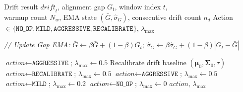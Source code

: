 \begin{algorithm}[t]
\caption{Agent Decision: Rule-Based KB Update Policy}
\label{alg:agent}
\begin{algorithmic}[1]
\REQUIRE Drift result $\textit{drift}_t$, alignment gap $G_t$, window index $t$, \\
\quad warmup count $N_w$, EMA state $(\bar{G}, \hat{\sigma}_G)$, consecutive drift count $n_d$
\ENSURE Action $\in \{\texttt{NO\_OP}, \texttt{MILD}, \texttt{AGGRESSIVE}, \texttt{RECALIBRATE}\}$, $\lambda_{\max}$

\STATE \textit{// Update Gap EMA:} $\bar{G} \leftarrow \beta \bar{G} + (1-\beta) G_t$; \; $\hat{\sigma}_G \leftarrow \beta \hat{\sigma}_G + (1-\beta)|G_t - \bar{G}|$

 
    \STATE $\textit{action} \leftarrow \texttt{AGGRESSIVE}$; \; $\lambda_{\max} \leftarrow 0.5$
        \STATE Recalibrate drift baseline $(\boldsymbol{\mu}_0, \boldsymbol{\Sigma}_0, \tau)$
    \ENDIF
{} 
    \STATE $\textit{action} \leftarrow \texttt{RECALIBRATE}$; \; $\lambda_{\max} \leftarrow 0.5$
 
    \STATE $\textit{action} \leftarrow \texttt{AGGRESSIVE}$; \; $\lambda_{\max} \leftarrow 0.5$
 
    \STATE $\textit{action} \leftarrow \texttt{MILD}$; \; $\lambda_{\max} \leftarrow 0.2$
\ELSE {}
    \STATE $\textit{action} \leftarrow \texttt{NO\_OP}$; \; $\lambda_{\max} \leftarrow 0$
\ENDIF
\RETURN $\textit{action}$, $\lambda_{\max}$
\end{algorithmic}
\end{algorithm}


